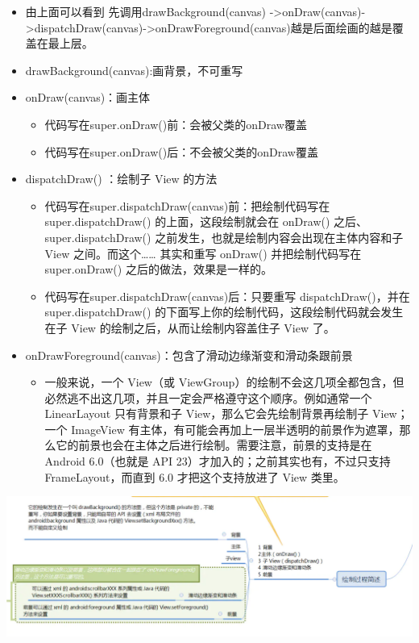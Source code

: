 \documentclass[9pt, b5paper]{article}
\begin{document}
\begin{itemize}
\item 由上面可以看到 先调用drawBackground(canvas) ->onDraw(canvas)->dispatchDraw(canvas)->onDrawForeground(canvas)越是后面绘画的越是覆盖在最上层。
\item drawBackground(canvas):画背景，不可重写
\item onDraw(canvas)：画主体
\begin{itemize}
\item 代码写在super.onDraw()前：会被父类的onDraw覆盖
\item 代码写在super.onDraw()后：不会被父类的onDraw覆盖
\end{itemize}
\item dispatchDraw() ：绘制子 View 的方法
\begin{itemize}
\item 代码写在super.dispatchDraw(canvas)前：把绘制代码写在 super.dispatchDraw() 的上面，这段绘制就会在 onDraw() 之后、 super.dispatchDraw() 之前发生，也就是绘制内容会出现在主体内容和子 View 之间。而这个…… 其实和重写 onDraw() 并把绘制代码写在 super.onDraw() 之后的做法，效果是一样的。
\item 代码写在super.dispatchDraw(canvas)后：只要重写 dispatchDraw()，并在 super.dispatchDraw() 的下面写上你的绘制代码，这段绘制代码就会发生在子 View 的绘制之后，从而让绘制内容盖住子 View 了。
\end{itemize}
\item onDrawForeground(canvas)：包含了滑动边缘渐变和滑动条跟前景
\begin{itemize}
\item 一般来说，一个 View（或 ViewGroup）的绘制不会这几项全都包含，但必然逃不出这几项，并且一定会严格遵守这个顺序。例如通常一个 LinearLayout 只有背景和子 View，那么它会先绘制背景再绘制子 View；一个 ImageView 有主体，有可能会再加上一层半透明的前景作为遮罩，那么它的前景也会在主体之后进行绘制。需要注意，前景的支持是在 Android 6.0（也就是 API 23）才加入的；之前其实也有，不过只支持 FrameLayout，而直到 6.0 才把这个支持放进了 View 类里。
\end{itemize}
\end{itemize}

\includegraphics[width=.9\linewidth]{./pic/drawprocess.png}
\end{document}
